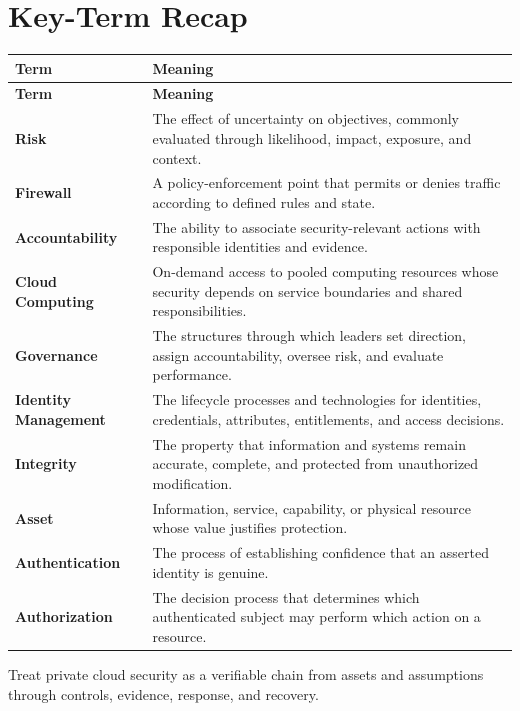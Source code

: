 \documentclass[11pt]{article}
\begin{document}
\section*{Key-Term Recap}
\begin{longtable}{>{\RaggedRight\arraybackslash}p{}>{\RaggedRight\arraybackslash}p{}}
\toprule\rowcolor{Navy}\color{white}\textbf{Term} & \color{white}\textbf{Meaning}\\\midrule
\endfirsthead
\toprule\rowcolor{Navy}\color{white}\textbf{Term} & \color{white}\textbf{Meaning}\\\midrule
\endhead
\textbf{Risk} & The effect of uncertainty on objectives, commonly evaluated through likelihood, impact, exposure, and context. \\\midrule
\textbf{Firewall} & A policy-enforcement point that permits or denies traffic according to defined rules and state. \\\midrule
\textbf{Accountability} & The ability to associate security-relevant actions with responsible identities and evidence. \\\midrule
\textbf{Cloud Computing} & On-demand access to pooled computing resources whose security depends on service boundaries and shared responsibilities. \\\midrule
\textbf{Governance} & The structures through which leaders set direction, assign accountability, oversee risk, and evaluate performance. \\\midrule
\textbf{Identity Management} & The lifecycle processes and technologies for identities, credentials, attributes, entitlements, and access decisions. \\\midrule
\textbf{Integrity} & The property that information and systems remain accurate, complete, and protected from unauthorized modification. \\\midrule
\textbf{Asset} & Information, service, capability, or physical resource whose value justifies protection. \\\midrule
\textbf{Authentication} & The process of establishing confidence that an asserted identity is genuine. \\\midrule
\textbf{Authorization} & The decision process that determines which authenticated subject may perform which action on a resource. \\\midrule
\bottomrule
\end{longtable}
\begin{takeawaybox}
Treat private cloud security as a verifiable chain from assets and assumptions through controls, evidence, response, and recovery.
\end{takeawaybox}
\end{document}
